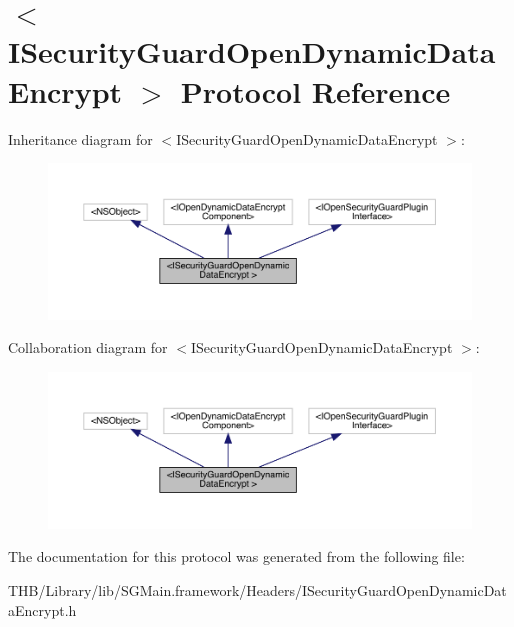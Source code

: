 \hypertarget{protocol_i_security_guard_open_dynamic_data_encrypt_01-p}{}\section{$<$I\+Security\+Guard\+Open\+Dynamic\+Data\+Encrypt $>$ Protocol Reference}
\label{protocol_i_security_guard_open_dynamic_data_encrypt_01-p}


Inheritance diagram for $<$I\+Security\+Guard\+Open\+Dynamic\+Data\+Encrypt $>$\+:\nopagebreak
\begin{figure}[H]
\begin{center}
\leavevmode
\includegraphics[width=350pt]{protocol_i_security_guard_open_dynamic_data_encrypt_01-p__inherit__graph}
\end{center}
\end{figure}


Collaboration diagram for $<$I\+Security\+Guard\+Open\+Dynamic\+Data\+Encrypt $>$\+:\nopagebreak
\begin{figure}[H]
\begin{center}
\leavevmode
\includegraphics[width=350pt]{protocol_i_security_guard_open_dynamic_data_encrypt_01-p__coll__graph}
\end{center}
\end{figure}


The documentation for this protocol was generated from the following file\+:\begin{DoxyCompactItemize}
\item 
T\+H\+B/\+Library/lib/\+S\+G\+Main.\+framework/\+Headers/I\+Security\+Guard\+Open\+Dynamic\+Data\+Encrypt.\+h\end{DoxyCompactItemize}
